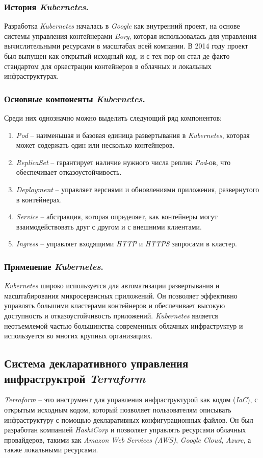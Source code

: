 \subsubsection{История \textit{Kubernetes}.}
Разработка \textit{Kubernetes} началась в \textit{Google} как внутренний проект, на основе системы управления контейнерами \textit{Borg}, которая использовалась для управления вычислительными ресурсами в масштабах всей компании. В 2014 году проект был выпущен как открытый исходный код, и с тех пор он стал де-факто стандартом для оркестрации контейнеров в облачных и локальных инфраструктурах.

\subsubsection{Основные компоненты \textit{Kubernetes}.} Среди них однозначно можно выделить следующий ряд компонентов:
\begin{enumerate}
    \item \textit{Pod} -- наименьшая и базовая единица развертывания в \textit{Kubernetes}, которая может содержать один или несколько контейнеров.
    \item \textit{ReplicaSet} -- гарантирует наличие нужного числа реплик \textit{Pod}-ов, что обеспечивает отказоустойчивость.
    \item \textit{Deployment} -- управляет версиями и обновлениями приложения, развернутого в контейнерах.
    \item \textit{Service} -- абстракция, которая определяет, как контейнеры могут взаимодействовать друг с другом и с внешними клиентами.
    \item \textit{Ingress} -- управляет входящими \textit{HTTP} и \textit{HTTPS} запросами в кластер.
\end{enumerate}

\subsubsection{Применение \textit{Kubernetes}.}
\textit{Kubernetes} широко используется для автоматизации развертывания и масштабирования микросервисных приложений. Он позволяет эффективно управлять большими кластерами контейнеров и обеспечивает высокую доступность и отказоустойчивость приложений. \textit{Kubernetes} является неотъемлемой частью большинства современных облачных инфраструктур и используется во многих крупных организациях.

\subsection{Система декларативного управления инфраструктрой \textit{Terraform}}
\label{sec:terraform}
\textit{Terraform} -- это инструмент для управления инфраструктурой как кодом (\textit{IaC}), с открытым исходным кодом, который позволяет пользователям описывать инфраструктуру с помощью декларативных конфигурационных файлов. Он был разработан компанией \textit{HashiCorp} и позволяет управлять ресурсами облачных провайдеров, такими как \textit{Amazon Web Services (AWS)}, \textit{Google Cloud}, \textit{Azure}, а также локальными ресурсами.

